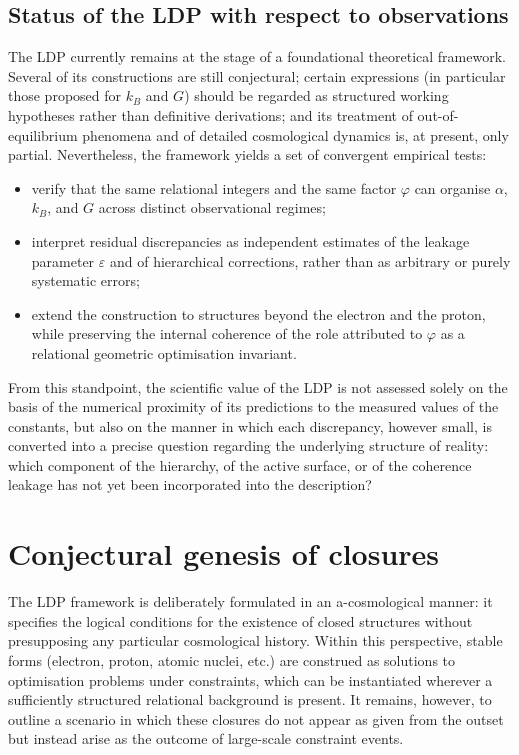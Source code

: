\documentclass[11pt,a4paper]{article}
\begin{document}
\subsection{Status of the LDP with respect to observations}
The LDP currently remains at the stage of a foundational theoretical framework. Several of its constructions are still conjectural; certain expressions (in particular those proposed for \(k_{B}\) and \(G\)) should be regarded as structured working hypotheses rather than definitive derivations; and its treatment of out-of-equilibrium phenomena and of detailed cosmological dynamics is, at present, only partial. Nevertheless, the framework yields a set of convergent empirical tests:
\begin{itemize}[label=-]
    \item verify that the same relational integers and the same factor \(\varphi\) can organise \(\alpha\), \(k_{B}\), and \(G\) across distinct observational regimes;
    \item interpret residual discrepancies as independent estimates of the leakage parameter \(\varepsilon\) and of hierarchical corrections, rather than as arbitrary or purely systematic errors;
    \item extend the construction to structures beyond the electron and the proton, while preserving the internal coherence of the role attributed to \(\varphi\) as a relational geometric optimisation invariant.
\end{itemize}
From this standpoint, the scientific value of the LDP is not assessed solely on the basis of the numerical proximity of its predictions to the measured values of the constants, but also on the manner in which each discrepancy, however small, is converted into a precise question regarding the underlying structure of reality: which component of the hierarchy, of the active surface, or of the coherence leakage has not yet been incorporated into the description?

\section{Conjectural genesis of closures}
The LDP framework is deliberately formulated in an a-cosmological manner: it specifies the logical conditions for the existence of closed structures without presupposing any particular cosmological history. Within this perspective, stable forms (electron, proton, atomic nuclei, etc.) are construed as solutions to optimisation problems under constraints, which can be instantiated wherever a sufficiently structured relational background is present. It remains, however, to outline a scenario in which these closures do not appear as given from the outset but instead arise as the outcome of large-scale constraint events. 
\end{document}
